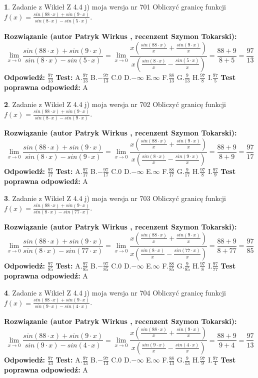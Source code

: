 \documentclass[12pt, a4paper]{article}
\theoremstyle{definition} %
\newtheorem{zad}{}
\newcommand{\zadStart}[1]{\begin{zad}#1\newline}
\newcommand{\zadStop}{\end{zad}}
\newcommand{\rozwStart}[2]{\noindent \textbf{Rozwiązanie (autor #1 , recenzent #2): }\newline}
\newcommand{\rozwStop}{\newline}
\newcommand{\odpStart}{\noindent \textbf{Odpowiedź:}\newline}
\newcommand{\odpStop}{\newline}
\newcommand{\testStart}{\noindent \textbf{Test:}\newline}
\newcommand{\testStop}{\newline}
\newcommand{\kluczStart}{\noindent \textbf{Test poprawna odpowiedź:}\newline}
\newcommand{\kluczStop}{\newline}
\begin{document}
\zadStart{Zadanie z Wikieł Z 4.4 j) moja wersja nr 701}
Obliczyć granicę funkcji $f(x)=\frac{sin(88\cdot x) +sin(9\cdot x)}{sin(8\cdot x) -sin(5\cdot x)}$.
\zadStop
\rozwStart{Patryk Wirkus}{Szymon Tokarski}
$$\lim\limits_{x\to 0}\frac{sin(88\cdot x) +sin(9\cdot x)}{sin(8\cdot x) -sin(5\cdot x)}=\lim\limits_{x\to 0}\frac{x(\frac{sin(88\cdot x)}{x}+\frac{sin(9\cdot x)}{x})}{x(\frac{sin(8\cdot x)}{x}-\frac{sin(5\cdot x)}{x})}=\frac{88+9}{8+5} = \frac{97}{13}$$
\rozwStop
\odpStart
$\frac{97}{13}$
\odpStop
\testStart
A.$\frac{97}{13}$
B.$-\frac{97}{13}$
C.$0$
D.$-\infty$
E.$\infty$
F.$\frac{88}{13}$
G.$\frac{9}{13}$
H.$\frac{97}{8}$
I.$\frac{97}{5}$
\testStop
\kluczStart
A
\kluczStop



\zadStart{Zadanie z Wikieł Z 4.4 j) moja wersja nr 702}
Obliczyć granicę funkcji $f(x)=\frac{sin(88\cdot x) +sin(9\cdot x)}{sin(8\cdot x) -sin(9\cdot x)}$.
\zadStop
\rozwStart{Patryk Wirkus}{Szymon Tokarski}
$$\lim\limits_{x\to 0}\frac{sin(88\cdot x) +sin(9\cdot x)}{sin(8\cdot x) -sin(9\cdot x)}=\lim\limits_{x\to 0}\frac{x(\frac{sin(88\cdot x)}{x}+\frac{sin(9\cdot x)}{x})}{x(\frac{sin(8\cdot x)}{x}-\frac{sin(9\cdot x)}{x})}=\frac{88+9}{8+9} = \frac{97}{17}$$
\rozwStop
\odpStart
$\frac{97}{17}$
\odpStop
\testStart
A.$\frac{97}{17}$
B.$-\frac{97}{17}$
C.$0$
D.$-\infty$
E.$\infty$
F.$\frac{88}{17}$
G.$\frac{9}{17}$
H.$\frac{97}{8}$
I.$\frac{97}{9}$
\testStop
\kluczStart
A
\kluczStop



\zadStart{Zadanie z Wikieł Z 4.4 j) moja wersja nr 703}
Obliczyć granicę funkcji $f(x)=\frac{sin(88\cdot x) +sin(9\cdot x)}{sin(8\cdot x) -sin(77\cdot x)}$.
\zadStop
\rozwStart{Patryk Wirkus}{Szymon Tokarski}
$$\lim\limits_{x\to 0}\frac{sin(88\cdot x) +sin(9\cdot x)}{sin(8\cdot x) -sin(77\cdot x)}=\lim\limits_{x\to 0}\frac{x(\frac{sin(88\cdot x)}{x}+\frac{sin(9\cdot x)}{x})}{x(\frac{sin(8\cdot x)}{x}-\frac{sin(77\cdot x)}{x})}=\frac{88+9}{8+77} = \frac{97}{85}$$
\rozwStop
\odpStart
$\frac{97}{85}$
\odpStop
\testStart
A.$\frac{97}{85}$
B.$-\frac{97}{85}$
C.$0$
D.$-\infty$
E.$\infty$
F.$\frac{88}{85}$
G.$\frac{9}{85}$
H.$\frac{97}{8}$
I.$\frac{97}{77}$
\testStop
\kluczStart
A
\kluczStop



\zadStart{Zadanie z Wikieł Z 4.4 j) moja wersja nr 704}
Obliczyć granicę funkcji $f(x)=\frac{sin(88\cdot x) +sin(9\cdot x)}{sin(9\cdot x) -sin(4\cdot x)}$.
\zadStop
\rozwStart{Patryk Wirkus}{Szymon Tokarski}
$$\lim\limits_{x\to 0}\frac{sin(88\cdot x) +sin(9\cdot x)}{sin(9\cdot x) -sin(4\cdot x)}=\lim\limits_{x\to 0}\frac{x(\frac{sin(88\cdot x)}{x}+\frac{sin(9\cdot x)}{x})}{x(\frac{sin(9\cdot x)}{x}-\frac{sin(4\cdot x)}{x})}=\frac{88+9}{9+4} = \frac{97}{13}$$
\rozwStop
\odpStart
$\frac{97}{13}$
\odpStop
\testStart
A.$\frac{97}{13}$
B.$-\frac{97}{13}$
C.$0$
D.$-\infty$
E.$\infty$
F.$\frac{88}{13}$
G.$\frac{9}{13}$
H.$\frac{97}{9}$
I.$\frac{97}{4}$
\testStop
\kluczStart
A
\kluczStop
\end{document}
